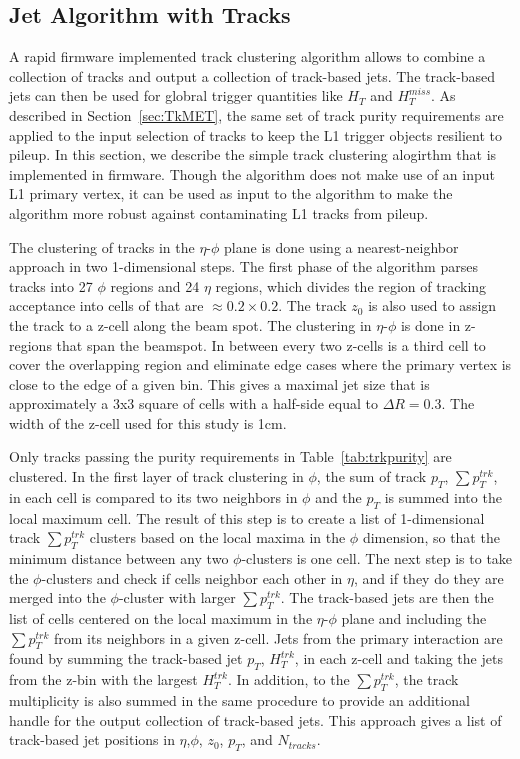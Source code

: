 \subsection{Jet Algorithm with Tracks}
\label{sec:TrkJets}

A rapid firmware implemented track clustering algorithm allows to combine a collection of tracks and output a collection of track-based jets. The track-based jets can then be used for globral trigger quantities like $H_{T}$ and $H_{T}^{miss}$. As described in Section~\ref{sec:TkMET}, the same set of track purity requirements are applied to the input selection of tracks to keep the L1 trigger objects resilient to pileup. In this section, we describe the simple track clustering alogirthm that is implemented in firmware. Though the algorithm does not make use of an input L1 primary vertex, it can be used as input to the algorithm to make the algorithm more robust against contaminating L1 tracks from pileup. 

The clustering of tracks in the $\eta$-$\phi$ plane is done using a nearest-neighbor approach in two 1-dimensional steps. The first phase of the algorithm parses tracks into 27 $\phi$ regions and 24 $\eta$ regions, which divides the region of tracking acceptance into cells of that are $\approx 0.2\times 0.2$. The track $z_{0} $ is also used to assign the track to a z-cell along the beam spot. The clustering in $\eta$-$\phi$ is done in z-regions that span the beamspot. In between every two z-cells is a third cell to cover the overlapping region and eliminate edge cases where the primary vertex is close to the edge of a given bin. This gives a maximal jet size that is approximately a 3x3 square of cells with a half-side equal to $\Delta R=0.3$. The width of the z-cell used for this study is 1cm. 

 Only tracks passing the purity requirements in Table~\ref{tab:trkpurity} are clustered. In the first layer of track clustering in $\phi$, the sum of track $p_{T}$, $\sum p_{T}^{trk}$, in each cell is compared to its two neighbors in $\phi$ and the $p_{T}$ is summed into the local maximum cell. The result of this step is to create a list of 1-dimensional track $\sum p_{T}^{trk}$ clusters based on the local maxima in the $\phi$ dimension, so that the minimum distance between any two $\phi$-clusters is one cell. The next step is to take the $\phi$-clusters and check if cells neighbor each other in $\eta$, and if they do they are merged into the $
\phi$-cluster with larger $\sum p_{T}^{trk}$. The track-based jets are then the list of cells centered on the local maximum in the $\eta$-$\phi$ plane and including the $\sum p_{T}^{trk}$ from its neighbors in a given z-cell. Jets from the primary interaction are found by summing the track-based jet $p_{T}$, $H_{T}^{trk}$, in each z-cell and taking the jets from the z-bin with the largest $H_{T}^{trk}$.  In addition, to the $\sum p_{T}^{trk}$, the track multiplicity is also summed in the same procedure to provide an additional handle for the output collection of track-based jets. This approach gives a list of track-based jet positions in $\eta$,$\phi$, $z_{0}$, $p_{T}$, and $N_{tracks}$.

